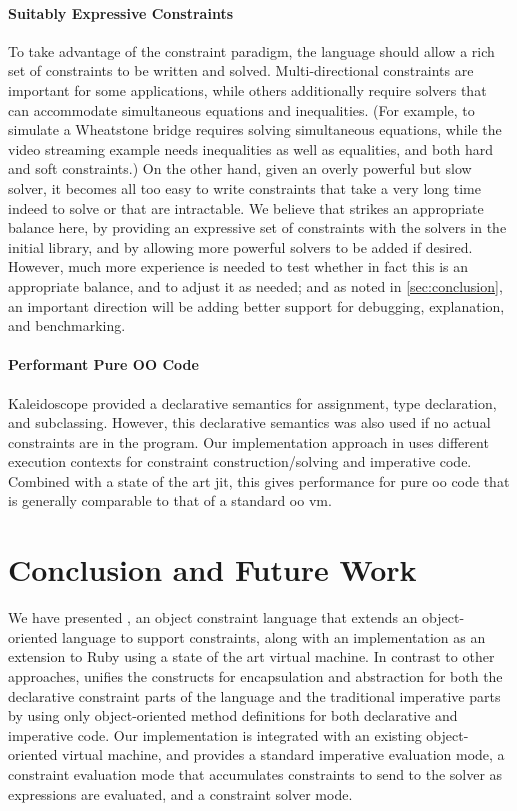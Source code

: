 \paragraph{Suitably Expressive Constraints}
To take advantage of the constraint paradigm, the language should
allow a rich set of constraints to be written and solved.
Multi-directional constraints are important for some applications,
while others additionally require solvers that can accommodate
simultaneous equations and inequalities.  (For example, to simulate a
Wheatstone bridge requires solving simultaneous equations, while the
video streaming example needs inequalities as well as equalities, and
both hard and soft constraints.)  On the other hand, given an overly
powerful but slow solver, it becomes all too easy to write constraints
that take a very long time indeed to solve or that are intractable.
We believe that \langname strikes an appropriate balance here, by
providing an expressive set of constraints with the solvers in the
initial library, and by allowing more powerful solvers to be added if
desired.  However, much more experience is needed to test whether in
fact this is an appropriate balance, and to adjust it as needed; and
as noted in \autoref{sec:conclusion}, an important
direction will be adding better support for debugging, explanation,
and benchmarking.

\paragraph{Performant Pure OO Code}
Kaleidoscope provided a declarative semantics for assignment, type
declaration, and subclassing. However, this declarative semantics was
also used if no actual constraints are in the program. Our
implementation approach in \toolname uses different execution contexts
for constraint construction/solving and imperative code. Combined with
a state of the art \ac{jit}, this gives performance for pure \ac{oo}
code that is generally comparable to that of a standard \ac{oo} \ac{vm}.

\section{Conclusion and Future Work}
\label{sec:conclusion}
We have presented \langname, an object constraint language that extends
an object-oriented language to support constraints, along with
an implementation as an extension to Ruby using a state of the art
virtual machine.  In contrast to other approaches, \langname unifies
the constructs for encapsulation and abstraction for both the
declarative constraint parts of the language and the traditional
imperative parts by using only object-oriented method definitions for
both declarative and imperative code.  Our implementation is
integrated with an existing object-oriented virtual machine, and
provides a standard imperative evaluation mode, a constraint
evaluation mode that accumulates constraints to send to the solver
as expressions are evaluated, and a constraint solver mode.

